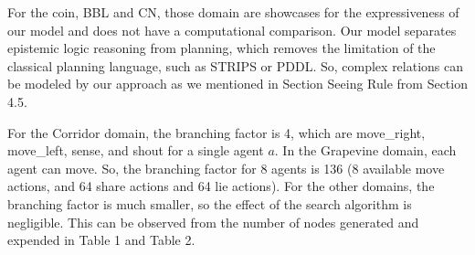 \documentclass[letterpaper]{article} %
\begin{document}
For the coin, BBL and CN, those domain are showcases for the expressiveness of our model and does not have a computational comparison.
Our model separates epistemic logic reasoning from planning, which removes the limitation of the classical planning language, such as STRIPS or PDDL.
So, complex relations can be modeled by our approach as we mentioned in Section Seeing Rule from Section 4.5.

For the Corridor domain, the branching factor is 4, which are move\_right, move\_left, sense, and shout for a single agent $a$.
In  the Grapevine domain, each agent can move.
So, the branching factor for 8 agents is 136 (8 available move actions, and 64 share actions and 64 lie actions).
For the other domains, the branching factor is much smaller, so the effect of the search algorithm is negligible. This can be observed from the number of nodes generated and expended in Table 1 and Table 2.
\end{document}
